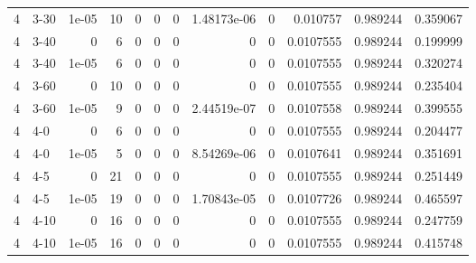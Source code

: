 \begin{tabular}{rlrrrrrrrrrr}
     4 & 3-30   &      1e-05 &          10 &                 0 &                 0 &     0           &     1.48173e-06 &      0           &        0.010757  &               0.989244 &           0.359067 \\
     4 & 3-40   &      0     &           6 &                 0 &                 0 &     0           &     0           &      0           &        0.0107555 &               0.989244 &           0.199999 \\
     4 & 3-40   &      1e-05 &           6 &                 0 &                 0 &     0           &     0           &      0           &        0.0107555 &               0.989244 &           0.320274 \\
     4 & 3-60   &      0     &          10 &                 0 &                 0 &     0           &     0           &      0           &        0.0107555 &               0.989244 &           0.235404 \\
     4 & 3-60   &      1e-05 &           9 &                 0 &                 0 &     0           &     2.44519e-07 &      0           &        0.0107558 &               0.989244 &           0.399555 \\
     4 & 4-0    &      0     &           6 &                 0 &                 0 &     0           &     0           &      0           &        0.0107555 &               0.989244 &           0.204477 \\
     4 & 4-0    &      1e-05 &           5 &                 0 &                 0 &     0           &     8.54269e-06 &      0           &        0.0107641 &               0.989244 &           0.351691 \\
     4 & 4-5    &      0     &          21 &                 0 &                 0 &     0           &     0           &      0           &        0.0107555 &               0.989244 &           0.251449 \\
     4 & 4-5    &      1e-05 &          19 &                 0 &                 0 &     0           &     1.70843e-05 &      0           &        0.0107726 &               0.989244 &           0.465597 \\
     4 & 4-10   &      0     &          16 &                 0 &                 0 &     0           &     0           &      0           &        0.0107555 &               0.989244 &           0.247759 \\
     4 & 4-10   &      1e-05 &          16 &                 0 &                 0 &     0           &     0           &      0           &        0.0107555 &               0.989244 &           0.415748 \\

\end{tabular}
